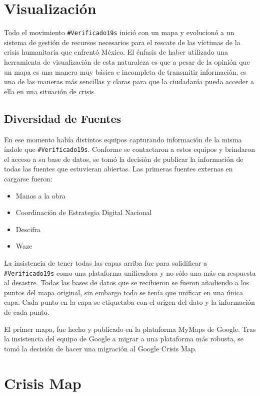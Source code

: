 \documentclass[12pt,spanish,oneside,breaklinks]{book}
\begin{document}
\section{Visualización}
\label{sec:orgf9d31d7}

Todo el movimiento \texttt{\#Verificado19s} inició con un mapa y evolucionó a un sistema de gestión de recursos necesarios para el rescate de las víctimas de la crisis humanitaria que enfrentó México. El énfasis de haber utilizado una herramienta de visualización de esta naturaleza es que a pesar de la opinión que un mapa es una manera muy básica e incompleta de transmitir información, es una de las maneras más sencillas y claras para que la ciudadanía pueda acceder a ella en una situación de crisis.

\subsection{Diversidad de Fuentes}
\label{sec:org4ed6ab2}

En ese momento había distintos equipos capturando información de la misma índole que \texttt{\#Verificado19s}. Conforme se contactaron a estos equipos y brindaron el acceso a su base de datos, se tomó la decisión de publicar la información de todas las fuentes que estuvieran abiertas. Las primeras fuentes externas en cargarse fueron:
\begin{itemize}
\item Manos a la obra
\item Coordinación de Estrategia Digital Nacional
\item Descifra
\item Waze
\end{itemize}

La insistencia de tener todas las capas arriba fue para solidificar a \texttt{\#Verificado19s} como una plataforma unificadora y no sólo una más en respuesta al desastre. Todas las bases de datos que se recibieron se fueron añadiendo a los puntos del mapa original, sin embargo todo se tenía que unificar en una única capa. Cada punto en la capa se etiquetaba con el origen del dato y la información de cada punto.

El primer mapa, fue hecho y publicado en la plataforma MyMaps de Google. Tras la insistencia del equipo de Google a migrar a una plataforma más robusta, se tomó la decisión de hacer una migración al Google Crisis Map.

\section{Crisis Map}
\label{sec:orgc02fc55}
\end{document}
